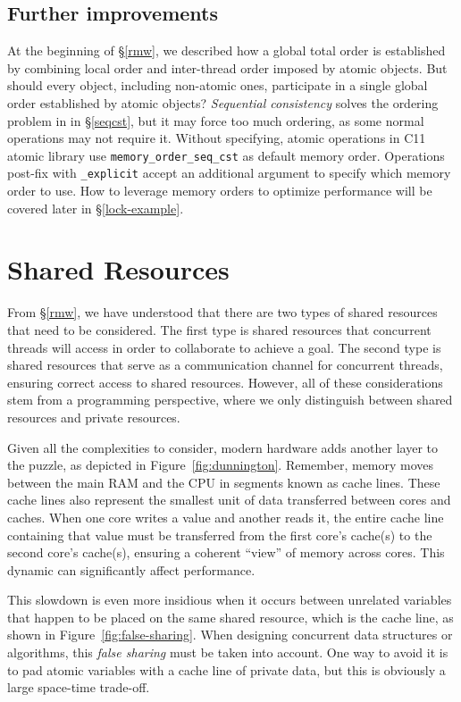 \documentclass[fontsize=10pt, oneside]{scrartcl}
\newcommand{\monobox}[1]{\mbox{\texttt{#1}}}
\newcommand{\clang}[1]{C#1}
\newcommand{\fig}[1]{Figure~\ref{#1}}
\newcommand{\introduce}[1]{\textit{#1}}
\newcommand{\secref}[1]{\hyperref[#1]{\textsc{\S}\ref*{#1}}}
\begin{document}
\subsection{Further improvements}
At the beginning of \secref{rmw}, we described how a global total order is established by combining local order and inter-thread order imposed by atomic objects. 
But should every object, including non-atomic ones, participate in a single global order established by atomic objects?
\introduce{Sequential consistency} solves the ordering problem in in \secref{seqcst}, but it may force too much ordering, as some normal operations may not require it.
Without specifying, atomic operations in \clang{}11 atomic library use \monobox{memory\_order\_seq\_cst} as default memory order. Operations post-fix with \monobox{\_explicit} accept an additional argument to specify which memory order to use.
How to leverage memory orders to optimize performance will be covered later in \secref{lock-example}.

\section{Shared Resources}
\label{shared-resources}
From \secref{rmw}, we have understood that there are two types of shared resources that need to be considered. 
The first type is shared resources that concurrent threads will access in order to collaborate to achieve a goal. 
The second type is shared resources that serve as a communication channel for concurrent threads, 
ensuring correct access to shared resources. 
However, all of these considerations stem from a programming perspective, 
where we only distinguish between shared resources and private resources. 

Given all the complexities to consider, modern hardware adds another layer to the puzzle, 
as depicted in \fig{fig:dunnington}. 
Remember, memory moves between the main \textsc{RAM} and the \textsc{CPU} in segments known as cache lines. 
These cache lines also represent the smallest unit of data transferred between cores and caches. 
When one core writes a value and another reads it, 
the entire cache line containing that value must be transferred from the first core's cache(s) to the second core's cache(s), 
ensuring a coherent ``view'' of memory across cores. This dynamic can significantly affect performance.

This slowdown is even more insidious when it occurs between unrelated variables that happen to be placed on the same shared resource, 
which is the cache line, as shown in \fig{fig:false-sharing}. 
When designing concurrent data structures or algorithms, 
this \introduce{false sharing} must be taken into account. 
One way to avoid it is to pad atomic variables with a cache line of private data, 
but this is obviously a large space-time trade-off.
\end{document}
